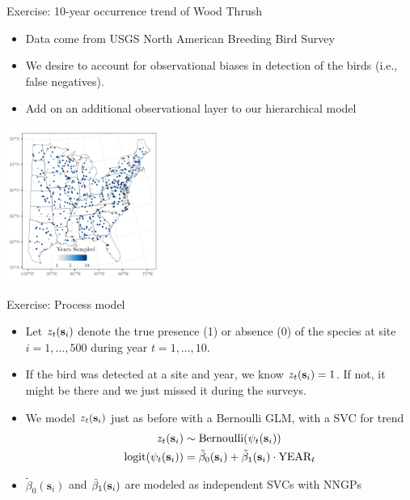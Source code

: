 \begin{frame}{Exercise: 10-year occurrence trend of Wood Thrush}

\begin{itemize}
     \item Data come from USGS North American Breeding Bird Survey
     \item We desire to account for observational biases in detection of the birds (i.e., false negatives).
     \item Add on an additional observational layer to our hierarchical model
\end{itemize}

\begin{center}
   \includegraphics[width=5cm]{../figures/EAWP-data.png}
\end{center}

\end{frame}

\begin{frame}{Exercise: Process model}
  \begin{itemize}
          \item Let $z_t(\textbf{s}_i)$ denote the true presence (1) or absence (0) of the species at site $i = 1, \dots, 500$ during year $t = 1, \dots, 10$. \pause
	  \item If the bird was detected at a site and year, we know $z_t(\textbf{s}_i) = 1$. If not, it might be there and we just missed it during the surveys. \pause
	  \item We model $z_t(\textbf{s}_i)$ just as before with a Bernoulli GLM, with a SVC for trend
          \begin{align*}
		  z_t(\textbf{s}_i) &\sim \text{Bernoulli}(\psi_t(\textbf{s}_i)) \\
		  \text{logit}(\psi_t(\textbf{s}_i)) &= \tilde{\beta}_0(\textbf{s}_i) + \tilde{\beta}_1(\textbf{s}_i) \cdot \text{YEAR}_t
	  \end{align*}
          \item $\tilde{\beta}_0(\bm{s}_i)$ and $\tilde{\beta}_1(\textbf{s}_i)$ are modeled as independent SVCs with NNGPs
  \end{itemize}

\end{frame}
	 

